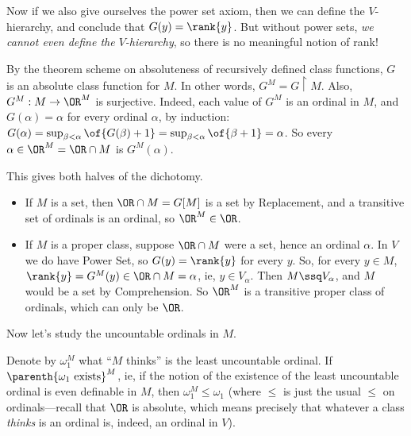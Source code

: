Now if we also give ourselves the power set axiom, then we can define the $V$-hierarchy, and conclude that $G(y) = \rank{y}$. But without power sets, \textit{we cannot even define the $V$-hierarchy}, so there is no meaningful notion of rank!

By the theorem scheme on absoluteness of recursively defined class functions, $G$ is an absolute class function for $M$. In other words, $G^M = G \restriction M$. Also, $G^M : M \to \OR^M$ is surjective. %
Indeed, each value of $G^M$ is an ordinal in $M$, and $G(\alpha) = \alpha$ for every ordinal $\alpha$, by induction: $G(\alpha) = \sup_{\beta < \alpha}\of{G(\beta) + 1} = \sup_{\beta < \alpha}\of{\beta + 1} = \alpha$. So every $\alpha \in \OR^M = \OR \cap M$ is $G^M(\alpha)$.

This gives both halves of the dichotomy.
\begin{itemize}
    \item If $M$ is a set, then $\OR \cap M = G[M]$ is a set by Replacement, and a transitive set of ordinals is an ordinal, so $\OR^M \in \OR$.
    \item If $M$ is a proper class, suppose $\OR \cap M$ were a set, hence an ordinal $\alpha$. In $V$ we do have Power Set, so $G(y) = \rank{y}$ for every $y$. So, for every $y \in M$, $\rank{y} = G^M(y) \in \OR \cap M = \alpha$, ie, $y \in V_{\alpha}$. Then $M \ssq V_{\alpha}$, and $M$ would be a set by Comprehension. So $\OR^M$ is a transitive proper class of ordinals, which can only be $\OR$.
\end{itemize}

Now let's study the uncountable ordinals in $M$.

Denote by $\omega_1^M$ what ``$M$ thinks'' is the least uncountable ordinal. If $\parenth{\omega_1 \text{ exists}}^M$, ie, if the notion of the existence of the least uncountable ordinal is even definable in $M$, then $\omega_1^M \leq \omega_1$ (where $\le$ is just the usual $\le$ on ordinals---recall that $\OR$ is absolute, which means precisely that whatever a class \textit{thinks} is an ordinal is, indeed, an ordinal in $V$).
